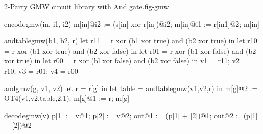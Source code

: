\begin{fpfig}[t]{2-Party GMW circuit library with And gate.}{fig-gmw}
{\footnotesize
  \begin{verbatimtab}
    encodegmw(in, i1, i2) {
      m[in]@i2 := (s[in] xor r[in])@i2;
      m[in]@i1 := r[in1]@2;
      m[in]
    }
    
    andtablegmw(b1, b2, r) {
      let r11 = r xor (b1 xor true) and (b2 xor true) in
      let r10 = r xor (b1 xor true) and (b2 xor false) in
      let r01 = r xor (b1 xor false) and (b2 xor true) in
      let r00 = r xor (bl xor false) and (b2 xor false) in
      { v1 = r11; v2 = r10; v3 = r01; v4 = r00 }
    }
    
    andgmw(g, v1, v2) {
      let r = r[g] in
      let table = andtablegmw(v1,v2,r) in
      m[g]@2 := OT4(v1,v2,table,2,1);
      m[g]@1 := r;
      m[g]
    }
    
    decodegmw(v) {
      p[1] := v@1; p[2] := v@2;
      out@1 := (p[1] + [2])@1;
      out@2 :=(p[1] + [2])@2
    }
  \end{verbatimtab}
}
\end{fpfig}
